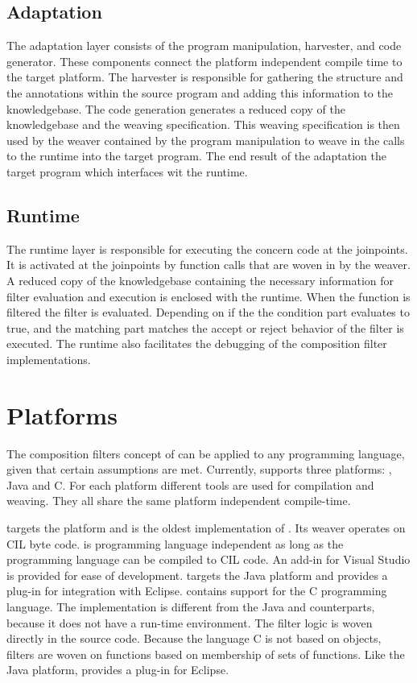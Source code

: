 \subsection{Adaptation}
The adaptation layer consists of the program manipulation, harvester, and code generator.
These components connect the platform independent compile time to the target platform.
The harvester is responsible for gathering the structure and the annotations within the source program and adding this information to the knowledgebase.
The code generation generates a reduced copy of the knowledgebase and the weaving specification.
This weaving specification is then used by the weaver contained by the program manipulation to weave in the calls to the runtime into the target program.
The end result of the adaptation the target program which interfaces wit the runtime.

\subsection{Runtime}
The runtime layer is responsible for executing the concern code at the joinpoints.
It is activated at the joinpoints by function calls that are woven in by the weaver.
A reduced copy of the knowledgebase containing the necessary information for filter evaluation and execution is enclosed with the runtime.
When the function is filtered the filter is evaluated.
Depending on if the the condition part evaluates to true, and the matching part matches the accept or reject behavior of the filter is executed.
The runtime also facilitates the debugging of the composition filter implementations.

\section{Platforms}
The composition filters concept of \Compose* can be applied to any programming language, given that certain assumptions are met.
Currently, \Compose* supports three platforms: \dotNET, Java and C\@.
For each platform different tools are used for compilation and weaving.
They all share the same platform independent compile-time.

\Compose*[.NET] targets the \dotNET platform and is the oldest implementation of \Compose*.
Its weaver operates on CIL byte code.
\Compose*[.NET] is programming language independent as long as the programming language can be compiled to CIL code.
An add-in for Visual Studio is provided for ease of development.
\Compose*[J] targets the Java platform and provides a plug-in for integration with Eclipse.
\Compose*[C] contains support for the C programming language.
The implementation is different from the Java and \dotNET counterparts, because it does not have a run-time environment.
The filter logic is woven directly in the source code.
Because the language C is not based on objects, filters are woven on functions based on membership of sets of functions.
Like the Java platform, \Compose*[C] provides a plug-in for Eclipse.